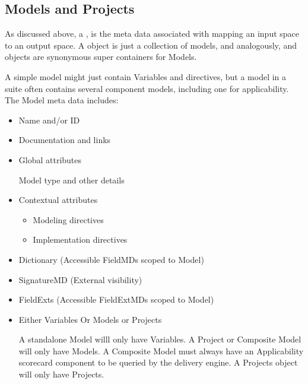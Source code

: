 \documentclass[10pt]{article}
\begin{document}
\subsection{Models\label{model}\label{models} and Projects\label{project}\label{projects}}

    As discussed above, a , is the meta data associated with mapping an input space to an output space.
    A  object is just a collection of models, and analogously,  and 
    objects are synonymous super containers for Models.

    A simple model might just contain Variables and directives, but a model in a suite often 
    contains several component models, including one for applicability.
    The Model meta data includes:
                \begin{itemize}[label=-,noitemsep,topsep=0pt]
                    \item Name and/or ID
                    \item Documentation and links
                    \item Global attributes\par
                        Model type and other details
                    \item Contextual attributes
                        \begin{itemize}[label=-,noitemsep,topsep=0pt]
                            \item Modeling directives
                            \item Implementation directives
                        \end{itemize}
                    \item Dictionary (Accessible FieldMDs scoped to Model)
                    \item SignatureMD (External visibility)
                    \item FieldExts (Accessible FieldExtMDs scoped to Model)
                    \item Either Variables Or Models or Projects\par
                        A standalone Model willl only have Variables.  A Project or Composite Model will only have Models.
                        A Composite Model must always have an Applicability scorecard component to be queried by 
                        the delivery engine.
                        A Projects object will only have Projects.
                \end{itemize}
\end{document}
